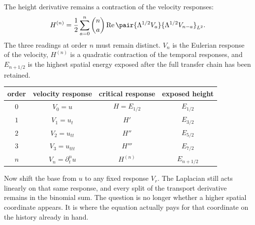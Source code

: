 The height derivative remains a contraction of the velocity responses:
\begin{equation}\label{eq:BodyHeightDerivativeVelocityContraction}
  H^{(n)}
  =\frac12\sum_{a=0}^{n}\binom{n}{a}
  \operatorname{Re}
  \pair{\Lambda^{1/2}V_a}
       {\Lambda^{1/2}V_{n-a}}_{L^2}.
\end{equation}
The three readings at order \(n\) must remain distinct.  \(V_n\) is the
Eulerian response of the velocity, \(H^{(n)}\) is a quadratic contraction of
the temporal responses, and \(E_{n+1/2}\) is the highest spatial energy
exposed after the full transfer chain has been retained.

\begin{center}
\captionsetup{hypcap=false}
\label{tab:CompletedCriticalHeightRows}
\small
\renewcommand{\arraystretch}{1.3}
\begin{tabular}{@{}c c c c@{}}
\toprule
order & velocity response & critical response & exposed height \\
\midrule
\(0\) & \(V_0=u\) & \(H=E_{1/2}\) & \(E_{1/2}\) \\
\(1\) & \(V_1=u_t\) & \(H'\) & \(E_{3/2}\) \\
\(2\) & \(V_2=u_{tt}\) & \(H''\) & \(E_{5/2}\) \\
\(3\) & \(V_3=u_{ttt}\) & \(H'''\) & \(E_{7/2}\) \\
\(n\) & \(V_n=\partial_t^nu\) & \(H^{(n)}\) & \(E_{n+1/2}\) \\
\bottomrule
\end{tabular}
\end{center}

Now shift the base from \(u\) to any fixed response \(V_r\).  The Laplacian
still acts linearly on that same response, and every split of the transport
derivative remains in the binomial sum.  The question is no longer whether a
higher spatial coordinate appears.  It is where the equation actually pays
for that coordinate on the history already in hand.
